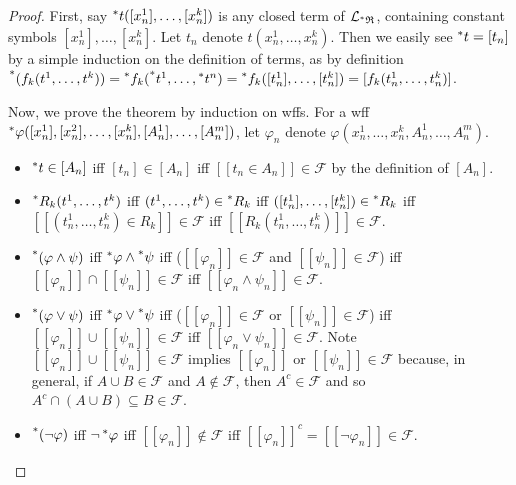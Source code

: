 \documentclass{article}
\newcommand{\hr}[1]{\prescript{*}{}{#1}}
\begin{document}
\begin{proof}
    First, say $\hr{t}([x^1_n], \ldots, [x^k_n])$ is any closed term of $\mathcal{L}_{\hr{\mathfrak R}}$, containing constant symbols $[x^1_n], \ldots, [x^k_n]$. Let $t_n$ denote $t(x^1_n, \ldots, x^k_n)$. Then we easily see $\hr{t} = [t_n]$ by a simple induction on the definition of terms, as by definition $\hr{(f_k(t^1, \ldots, t^k))} = \hr{f_k}(\hr{t^1}, \ldots, \hr{t^n}) = \hr{f_k}([t^1_n], \ldots, [t^k_n]) = [f_k(t^1_n, \ldots, t^k_n)]$.

    Now, we prove the theorem by induction on wffs. For a wff $\hr\varphi([x^1_n], [x^2_n], \ldots, [x^k_n], [A^1_n], \ldots, [A^m_n])$, let $\varphi_n$ denote $\varphi(x^1_n, \ldots, x^k_n, A^1_n, \ldots, A^m_n)$.
    
    \begin{itemize}
        \item $\hr{t} \in [A_n]$ iff $[t_n] \in [A_n]$ iff $[[t_n \in A_n]] \in \mathcal{F}$ by the definition of $[A_n]$.
        
        \item $\hr{R_k}(t^1, \ldots, t^k)$ iff $(t^1, \ldots, t^k) \in \hr{R_k}$ iff $([t^1_n], \ldots, [t^k_n]) \in \hr{R_k}$ iff $[[(t^1_n, \ldots, t^k_n) \in R_k]] \in \mathcal{F}$ iff $[[R_k(t^1_n, \ldots, t^k_n)]] \in \mathcal{F}$.
        
        \item $\hr{(\varphi \land \psi)}$ iff $\hr{\varphi} \land \hr{\psi}$ iff ($[[\varphi_n]] \in \mathcal {F}$ and $[[\psi_n]] \in \mathcal{F}$) iff $[[\varphi_n]] \cap [[\psi_n]] \in \mathcal{F}$ iff $[[\varphi_n \land \psi_n]] \in \mathcal{F}$.
        
        \item $\hr{(\varphi \lor \psi)}$ iff $\hr{\varphi} \lor \hr{\psi}$ iff ($[[\varphi_n]] \in \mathcal {F}$ or $[[\psi_n]] \in \mathcal{F}$) iff $[[\varphi_n]] \cup [[\psi_n]] \in \mathcal{F}$ iff $[[\varphi_n \lor \psi_n]] \in \mathcal{F}$. Note $[[\varphi_n]] \cup [[\psi_n]] \in \mathcal{F}$ implies $[[\varphi_n]]$ or $[[\psi_n]] \in \mathcal{F}$ because, in general, if $A \cup B \in \mathcal{F}$ and $A \notin \mathcal{F}$, then $A^c \in \mathcal{F}$ and so $A^c \cap (A \cup B) \subseteq B \in \mathcal{F}$.
        
        \item $\hr{(\neg \varphi)}$ iff $\neg \hr{\varphi}$ iff $[[\varphi_n]] \notin \mathcal{F}$ iff $[[\varphi_n]]^c = [[\neg \varphi_n]] \in \mathcal{F}$.
        

\end{itemize}
\end{proof}
\end{document}
